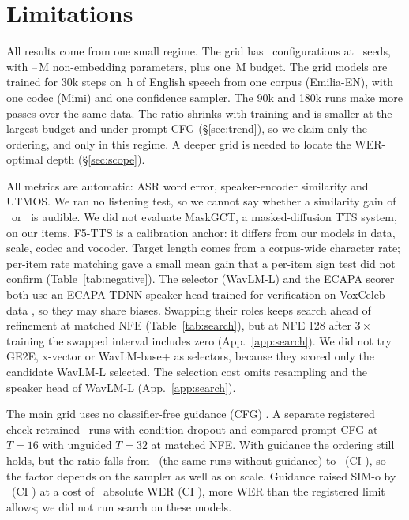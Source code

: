 \section{Limitations}
\label{sec:limits}
All results come from one small regime. The grid has \Nconfigs\ configurations at \Nseeds\ seeds, with
\NminN--\NmaxN\,M non-embedding parameters, plus one \NmaxNfour\,M budget. The grid models are
trained for 30k steps on \NtrainHours\,h of English speech from one corpus (Emilia-EN), with one
codec (Mimi) and one confidence sampler. The 90k and 180k runs make more passes over the same
data. The ratio shrinks with training and is smaller at the largest budget and under prompt
CFG (\S\ref{sec:trend}), so we claim only the ordering, and only in this regime. A deeper grid is needed to locate the WER-optimal
depth (\S\ref{sec:scope}).

All metrics are automatic: ASR word error, speaker-encoder similarity and UTMOS. We ran no
listening test, so we cannot say whether a similarity gain of \NcrMatchLod\ or \NcrXEWLod\ is
audible. We did not evaluate MaskGCT, a masked-diffusion TTS system, on our items. F5-TTS is a calibration anchor: it differs from our
models in data, scale, codec and vocoder. Target length comes from a corpus-wide character
rate; per-item rate matching gave a small mean gain that a per-item sign test did not confirm
(Table~\ref{tab:negative}).
The selector (WavLM-L) and the ECAPA scorer both use an ECAPA-TDNN speaker head \citep{ecapa}
trained for verification on VoxCeleb data \citep{voxceleb1,voxceleb2}, so they may share
biases. Swapping their roles keeps search ahead of refinement at matched NFE
(Table~\ref{tab:search}), but at NFE 128 after $3\times$ training the swapped interval includes
zero (App.~\ref{app:search}). We did not try GE2E, x-vector or WavLM-base+ as selectors, because
they scored only the candidate WavLM-L selected. The selection cost omits resampling and the
speaker head of WavLM-L (App.~\ref{app:search}).

The main grid uses no classifier-free guidance (CFG) \citep{cfg}. A separate registered check
retrained \NcrCfgRuns\ runs with condition dropout and compared prompt CFG at $T{=}16$ with
unguided $T{=}32$ at matched NFE. With guidance the ordering still holds, but the ratio
falls from \NcrCfgRatioUnguided\ (the same runs without guidance) to \NcrCfgRatio\ (CI
\NcrCfgRatioci), so the factor depends on the sampler as well as on scale. Guidance raised
SIM-o by \NcrCfgDsim\ (CI \NcrCfgDsimci) at a cost of \NcrCfgDwer\ absolute WER (CI
\NcrCfgDwerci), more WER than the registered limit allows; we did not run search on these
models.

